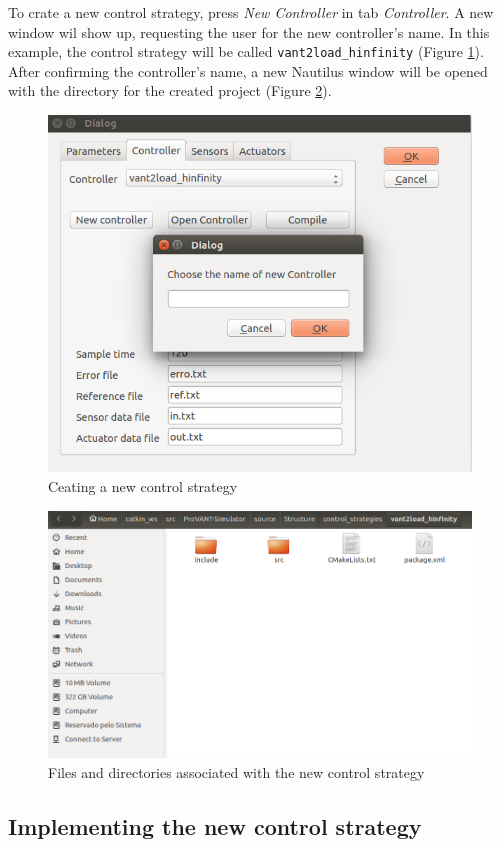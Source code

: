 To crate a new control strategy, press \textit{New Controller} in tab \textit{Controller}. A new window wil show up, requesting the user for the new controller's name. In this example, the control strategy will be called \texttt{vant2load\_hinfinity} (Figure \ref{projeto1}). After confirming the controller's name, a new Nautilus window will be opened with the directory for the created project (Figure \ref{2a}).

\begin{figure}[!ht]
	\centering
	\includegraphics[width=0.7\columnwidth]{figuras/1a1a1.png}
	\caption{Ceating a new control strategy}
	\label{projeto1}
\end{figure}

\begin{figure}[!ht]
	\centering
	\includegraphics[width=0.7\columnwidth]{figuras/2a.png}
	\caption{Files and directories associated with the new control strategy}
	\label{2a}
\end{figure}

\subsection{Implementing the new control strategy}

